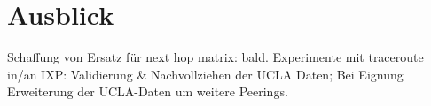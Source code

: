 \section{Ausblick}\label{sec:ausblick}

Schaffung von Ersatz für next hop matrix: bald.
Experimente mit traceroute in/an IXP: Validierung \& Nachvollziehen der UCLA Daten; Bei Eignung Erweiterung der UCLA-Daten um weitere Peerings.


%
%

